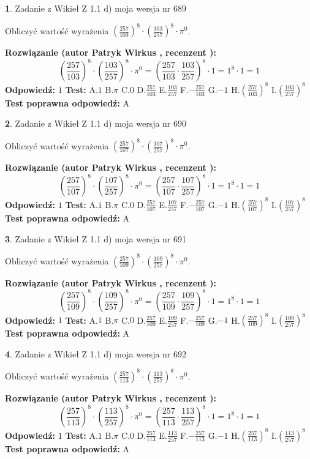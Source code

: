 \documentclass[12pt, a4paper]{article}
\theoremstyle{definition} %
\newtheorem{zad}{}
\newcommand{\zadStart}[1]{\begin{zad}#1\newline}
\newcommand{\zadStop}{\end{zad}}
\newcommand{\rozwStart}[2]{\noindent \textbf{Rozwiązanie (autor #1 , recenzent #2): }\newline}
\newcommand{\rozwStop}{\newline}
\newcommand{\odpStart}{\noindent \textbf{Odpowiedź:}\newline}
\newcommand{\odpStop}{\newline}
\newcommand{\testStart}{\noindent \textbf{Test:}\newline}
\newcommand{\testStop}{\newline}
\newcommand{\kluczStart}{\noindent \textbf{Test poprawna odpowiedź:}\newline}
\newcommand{\kluczStop}{\newline}
\begin{document}
\zadStart{Zadanie z Wikieł Z 1.1 d) moja wersja nr 689}

Obliczyć wartość wyrażenia $(\frac{257}{103})^{8} \cdot (\frac{103}{257})^{8} \cdot \pi^{0}$.
\zadStop
\rozwStart{Patryk Wirkus}{}
$$(\frac{257}{103})^{8} \cdot (\frac{103}{257})^{8} \cdot \pi^{0} = (\frac{257}{103} \cdot \frac{103}{257})^{8} \cdot 1 = 1^{8} \cdot 1 = 1$$
\rozwStop
\odpStart
$1$
\odpStop
\testStart
A.$1$ B.$\pi$ C.$0$ D.$\frac{257}{103}$ E.$\frac{103}{257}$
F.$-\frac{257}{103}$ G.$-1$
H.$(\frac{257}{103})^{8}$
I.$(\frac{103}{257})^{8}$
\testStop
\kluczStart
A
\kluczStop



\zadStart{Zadanie z Wikieł Z 1.1 d) moja wersja nr 690}

Obliczyć wartość wyrażenia $(\frac{257}{107})^{8} \cdot (\frac{107}{257})^{8} \cdot \pi^{0}$.
\zadStop
\rozwStart{Patryk Wirkus}{}
$$(\frac{257}{107})^{8} \cdot (\frac{107}{257})^{8} \cdot \pi^{0} = (\frac{257}{107} \cdot \frac{107}{257})^{8} \cdot 1 = 1^{8} \cdot 1 = 1$$
\rozwStop
\odpStart
$1$
\odpStop
\testStart
A.$1$ B.$\pi$ C.$0$ D.$\frac{257}{107}$ E.$\frac{107}{257}$
F.$-\frac{257}{107}$ G.$-1$
H.$(\frac{257}{107})^{8}$
I.$(\frac{107}{257})^{8}$
\testStop
\kluczStart
A
\kluczStop



\zadStart{Zadanie z Wikieł Z 1.1 d) moja wersja nr 691}

Obliczyć wartość wyrażenia $(\frac{257}{109})^{8} \cdot (\frac{109}{257})^{8} \cdot \pi^{0}$.
\zadStop
\rozwStart{Patryk Wirkus}{}
$$(\frac{257}{109})^{8} \cdot (\frac{109}{257})^{8} \cdot \pi^{0} = (\frac{257}{109} \cdot \frac{109}{257})^{8} \cdot 1 = 1^{8} \cdot 1 = 1$$
\rozwStop
\odpStart
$1$
\odpStop
\testStart
A.$1$ B.$\pi$ C.$0$ D.$\frac{257}{109}$ E.$\frac{109}{257}$
F.$-\frac{257}{109}$ G.$-1$
H.$(\frac{257}{109})^{8}$
I.$(\frac{109}{257})^{8}$
\testStop
\kluczStart
A
\kluczStop



\zadStart{Zadanie z Wikieł Z 1.1 d) moja wersja nr 692}

Obliczyć wartość wyrażenia $(\frac{257}{113})^{8} \cdot (\frac{113}{257})^{8} \cdot \pi^{0}$.
\zadStop
\rozwStart{Patryk Wirkus}{}
$$(\frac{257}{113})^{8} \cdot (\frac{113}{257})^{8} \cdot \pi^{0} = (\frac{257}{113} \cdot \frac{113}{257})^{8} \cdot 1 = 1^{8} \cdot 1 = 1$$
\rozwStop
\odpStart
$1$
\odpStop
\testStart
A.$1$ B.$\pi$ C.$0$ D.$\frac{257}{113}$ E.$\frac{113}{257}$
F.$-\frac{257}{113}$ G.$-1$
H.$(\frac{257}{113})^{8}$
I.$(\frac{113}{257})^{8}$
\testStop
\kluczStart
A
\kluczStop
\end{document}
